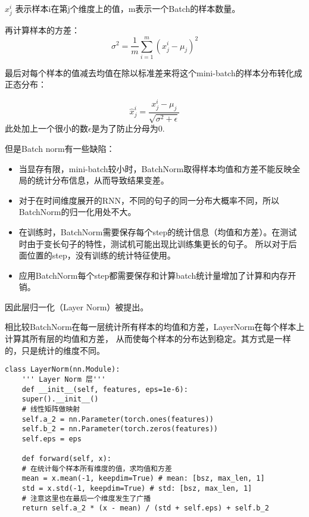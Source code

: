 \documentclass{article}
\begin{document}
$x^{i}_{j}$ 表示样本i在第j个维度上的值，m表示一个Batch的样本数量。

再计算样本的方差：
\begin{equation}
    \sigma^2 = \frac{1}{m} \sum_{i=1}^{m} (x^{i}_{j} - \mu_j)^2 
    \label{eq:batchnorm2}
\end{equation}

最后对每个样本的值减去均值在除以标准差来将这个mini-batch的样本分布转化成正态分布：

\begin{equation}
    \hat{x}^{i}_{j} = \frac{x^{i}_{j} - \mu_j}{\sqrt{\sigma^2 + \epsilon}}
    \label{eq:batchnorm3}
\end{equation}
此处加上一个很小的数$\epsilon$是为了防止分母为0.

但是Batch norm有一些缺陷：
\begin{itemize}
    \item 当显存有限，mini-batch较小时，BatchNorm取得样本均值和方差不能反映全局的统计分布信息，从而导致结果变差。
    \item 对于在时间维度展开的RNN，不同的句子的同一分布大概率不同，所以BatchNorm的归一化用处不大。
    \item 在训练时，BatchNorm需要保存每个step的统计信息（均值和方差）。在测试时由于变长句子的特性，测试机可能出现比训练集更长的句子。
          所以对于后面位置的step，没有训练的统计特征使用。
    \item 应用BatchNorm每个step都需要保存和计算batch统计量增加了计算和内存开销。
\end{itemize}

因此层归一化（Layer Norm）被提出。

相比较BatchNorm在每一层统计所有样本的均值和方差，LayerNorm在每个样本上计算其所有层的均值和方差，
从而使每个样本的分布达到稳定。其方式是一样的，只是统计的维度不同。
\begin{verbatim}
class LayerNorm(nn.Module):
    ''' Layer Norm 层'''
    def __init__(self, features, eps=1e-6):
	super().__init__()
    # 线性矩阵做映射
	self.a_2 = nn.Parameter(torch.ones(features))
	self.b_2 = nn.Parameter(torch.zeros(features))
	self.eps = eps
	
    def forward(self, x):
	# 在统计每个样本所有维度的值，求均值和方差
	mean = x.mean(-1, keepdim=True) # mean: [bsz, max_len, 1]
	std = x.std(-1, keepdim=True) # std: [bsz, max_len, 1]
    # 注意这里也在最后一个维度发生了广播
	return self.a_2 * (x - mean) / (std + self.eps) + self.b_2
\end{verbatim}

% 
\end{document}
